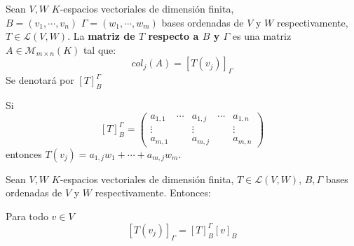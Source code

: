 \begin{definition}{}{}
    Sean $V, W$ $K$-espacios vectoriales de dimensión finita, $B = (v_1, \cdots, v_n) \, \, \Gamma = (w_1, \cdots, w_m)$ bases ordenadas de $V$ y $W$ respectivamente, $T \in \mathcal{L}(V,W)$. La \textbf{matriz de $T$ respecto a $B$ y $\Gamma$} es una matriz $A \in \mathcal{M}_{m \times n}(K)$ tal que:
    $$col_j(A) = [T(v_j)]_\Gamma$$
    Se denotará por $[T]_{B}^\Gamma$
\end{definition}
\begin{obs}{}{}
    Si $$[T]_{B}^\Gamma = \begin{pmatrix}
        a_{1,1} & \cdots & a_{1,j} & \cdots & a_{1,n}\\
        \vdots &  &\vdots& & \vdots\\
        a_{m,1} & &a_{m,j}& & a_{m,n}
    \end{pmatrix}$$
    entonces $T(v_j) = a_{1,j}w_1 + \cdots + a_{m,j}w_m$.
\end{obs}
\begin{proposition}{}{}
    Sean $V, W$ $K$-espacios vectoriales de dimensión finita, $T \in \mathcal{L}(V,W)$, $B, \Gamma$ bases ordenadas de $V$ y $W$ respectivamente. Entonces:
    
    Para todo $v \in V$
    $$[T(v_j)]_\Gamma = [T]_B^\Gamma [v]_B$$
\end{proposition}


